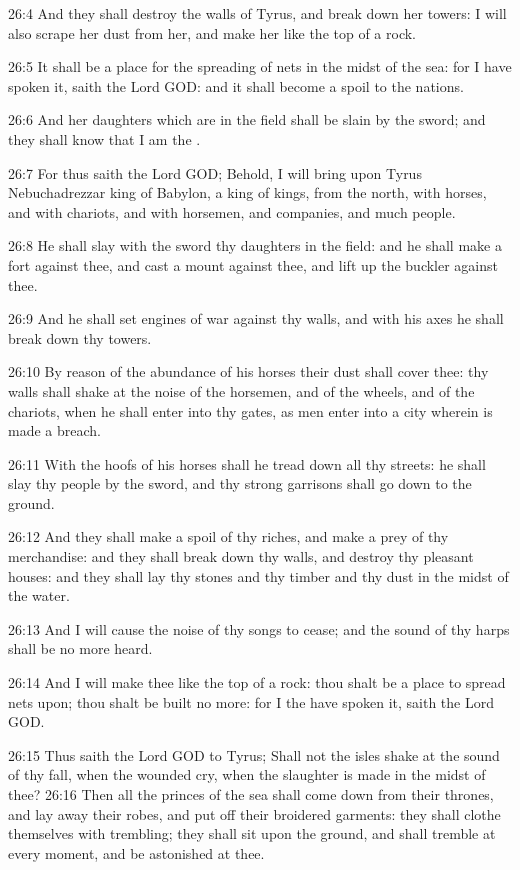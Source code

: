26:4 And they shall destroy the walls of Tyrus, and break down her towers: I will also scrape her dust from her, and make her like the top of a rock.

26:5 It shall be a place for the spreading of nets in the midst of the sea: for I have spoken it, saith the Lord GOD: and it shall become a spoil to the nations.

26:6 And her daughters which are in the field shall be slain by the sword; and they shall know that I am the \LORD.

26:7 For thus saith the Lord GOD; Behold, I will bring upon Tyrus Nebuchadrezzar king of Babylon, a king of kings, from the north, with horses, and with chariots, and with horsemen, and companies, and much people.

26:8 He shall slay with the sword thy daughters in the field: and he shall make a fort against thee, and cast a mount against thee, and lift up the buckler against thee.

26:9 And he shall set engines of war against thy walls, and with his axes he shall break down thy towers.

26:10 By reason of the abundance of his horses their dust shall cover thee: thy walls shall shake at the noise of the horsemen, and of the wheels, and of the chariots, when he shall enter into thy gates, as men enter into a city wherein is made a breach.

26:11 With the hoofs of his horses shall he tread down all thy streets: he shall slay thy people by the sword, and thy strong garrisons shall go down to the ground.

26:12 And they shall make a spoil of thy riches, and make a prey of thy merchandise: and they shall break down thy walls, and destroy thy pleasant houses: and they shall lay thy stones and thy timber and thy dust in the midst of the water.

26:13 And I will cause the noise of thy songs to cease; and the sound of thy harps shall be no more heard.

26:14 And I will make thee like the top of a rock: thou shalt be a place to spread nets upon; thou shalt be built no more: for I the \LORD have spoken it, saith the Lord GOD.

26:15 Thus saith the Lord GOD to Tyrus; Shall not the isles shake at the sound of thy fall, when the wounded cry, when the slaughter is made in the midst of thee?  26:16 Then all the princes of the sea shall come down from their thrones, and lay away their robes, and put off their broidered garments: they shall clothe themselves with trembling; they shall sit upon the ground, and shall tremble at every moment, and be astonished at thee.

